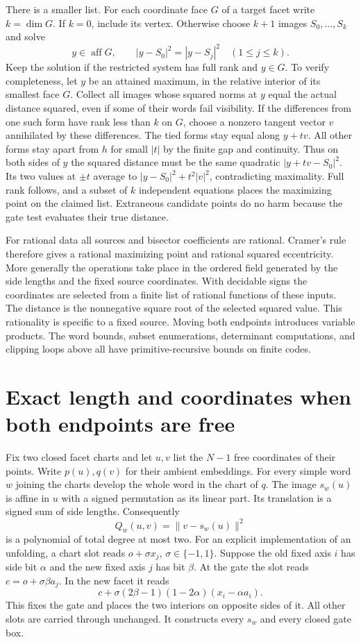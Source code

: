 \documentclass[10pt,letterpaper]{article}
\begin{document}
There is a smaller list. For each coordinate face $G$ of a target facet
write $k=\dim G$. If $k=0$, include its vertex. Otherwise choose
$k+1$ images $S_0,\ldots,S_k$ and solve
\[
 y\in\operatorname{aff}G,\qquad
       |y-S_0|^2=|y-S_j|^2\quad(1\le j\le k).
\]
Keep the solution if the restricted system has full rank and $y\in G$.
To verify completeness, let $y$ be an attained maximum, in the relative
interior of its smallest face $G$. Collect all images whose squared norms
at $y$ equal the actual distance squared, even if some of their words fail
visibility. If the differences from one such form have rank less than $k$
on $G$, choose a nonzero tangent vector $v$ annihilated by these differences.
The tied forms stay equal along $y+tv$. All other forms stay apart from
$h$ for small $|t|$ by the finite gap and continuity. Thus on both sides of
$y$ the squared distance must be the same quadratic $|y+tv-S_0|^2$.
Its two values at $\pm t$ average to $|y-S_0|^2+t^2|v|^2$, contradicting
maximality. Full rank follows, and a subset of $k$ independent equations
places the maximizing point on the claimed list. Extraneous candidate points
do no harm because the gate test evaluates their true distance.

For rational data all sources and bisector coefficients are rational.
Cramer's rule therefore gives a rational maximizing point and rational
squared eccentricity. More generally the operations take place in the
ordered field generated by the side lengths and the fixed source
coordinates. With decidable signs the coordinates are selected from a
finite list of rational functions of these inputs. The distance is the
nonnegative square root of the selected squared value. This rationality is
specific to a fixed source. Moving both endpoints introduces variable
products. The word bounds, subset enumerations, determinant computations,
and clipping loops above all have primitive-recursive bounds on finite
codes.


\section{Exact length and coordinates when both endpoints are free}\label{sec:free}
Fix two closed facet charts and let $u,v$ list the $N-1$ free coordinates of their points. Write $p(u),q(v)$ for their ambient embeddings. For every simple word $w$ joining the charts develop the whole word in the chart of $q$. The image $s_w(u)$ is affine in $u$ with a signed permutation as its linear part. Its translation is a signed sum of side lengths. Consequently
\[
                 Q_w(u,v)=\|v-s_w(u)\|^2
\]
is a polynomial of total degree at most two. For an explicit implementation of an unfolding, a chart slot reads $o+\sigma x_j$, $\sigma\in\{-1,1\}$. Suppose the old fixed axis $i$ has side bit $\alpha$ and the new fixed axis $j$ has bit $\beta$. At the gate the slot reads $c=o+\sigma\beta a_j$. In the new facet it reads
\[
      c+\sigma(2\beta-1)(1-2\alpha)(x_i-\alpha a_i).
\]
This fixes the gate and places the two interiors on opposite sides of it. All other slots are carried through unchanged. It constructs every $s_w$ and every closed gate box.
\end{document}
